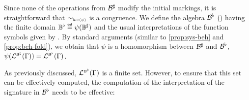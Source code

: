 Since none of the operations from ${\mathcal{B}}^\sharp$ modify the
initial markings, it is straightforward that $\sim_{\scriptscriptstyle{\mathrm{ker}(\psi)}}$ is a
\hrtext{} congruence. We define the algebra ${\mathcal{B}}^\flat$
() having the finite domain
${\mathbb{B}}^\flat \stackrel{\scriptscriptstyle{\mathsf{def}}}{=} \psi({\mathbb{B}}^\sharp)$ and
the usual interpretations of the \hrtext{} function symbols given by
. By standard arguments (similar to
\autoref{prop:sys-beh} and \autoref{prop:beh-fold}), we obtain that
$\psi$ is a homomorphism between ${\mathcal{B}}^\sharp$ and
${\mathcal{B}}^\flat$, \ie
$\psi(\mathcal{L}_{}^{\scriptscriptstyle{{\mathcal{B}}^\sharp}}({\Gamma})) =
\mathcal{L}_{}^{\scriptscriptstyle{{\mathcal{B}}^\flat}}({\Gamma})$.

As previously discussed, $\mathcal{L}_{}^{\scriptscriptstyle{{\mathcal{B}}^\flat}}({\Gamma})$
is a finite set. However, to ensure that this set can be effectively
computed, the computation of the interpretation of the
\hrtext{} signature in ${\mathcal{B}}^\flat$ needs to be effective:

